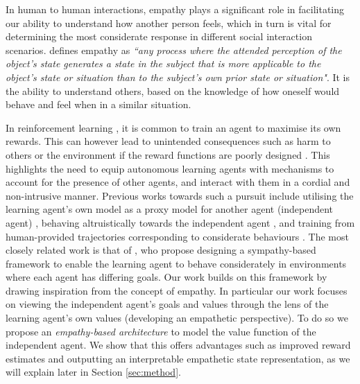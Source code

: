 \iffalse
In human to human interactions, empathy plays a significant role in facilitating our ability to understand how another person feels, which in turn is vital for determining the most considerate response in different social interaction scenarios. %
\cite{hoffman1996empathy} defines empathy as \textit{``any process where the attended perception of the object’s state generates a state in the subject that is more applicable to the object’s state or situation than to the subject’s own prior state or situation"}. It is the ability to understand others, %
based on the knowledge of how oneself would behave and feel when in a similar situation. 

In reinforcement learning \cite{sutton2018reinforcement}, it is common to train an agent to maximise its own rewards. This can however lead to unintended consequences such as harm to others or the environment if the reward functions are poorly designed \cite{amodei2016concrete}. This highlights the need to equip autonomous learning agents with mechanisms to account for the presence of other agents, and interact with them in a cordial and non-intrusive manner. Previous works towards such a pursuit include utilising the learning agent's own model as a proxy model for another agent (independent agent) \cite{TowardsEmpathicDQN}, behaving altruistically towards the independent agent \cite{Franzmeyer2021}, and training from human-provided trajectories corresponding to considerate behaviours \cite{Noothigattu2019}. The most closely related work is that of \cite{SympathyPaper}, who propose designing a sympathy-based framework to enable the learning agent to behave considerately in environments where each agent has differing goals. %
Our work builds on this framework by drawing inspiration from the concept of empathy. In particular our work focuses on viewing the independent agent's goals and values through the lens of the learning agent's own values (developing an empathetic perspective). To do so we propose an
\textit{empathy-based architecture} to model the value function of the independent agent.
We show that this offers advantages such as improved reward estimates and outputting an interpretable empathetic state representation, as we will explain later in Section \ref{sec:method}.  
